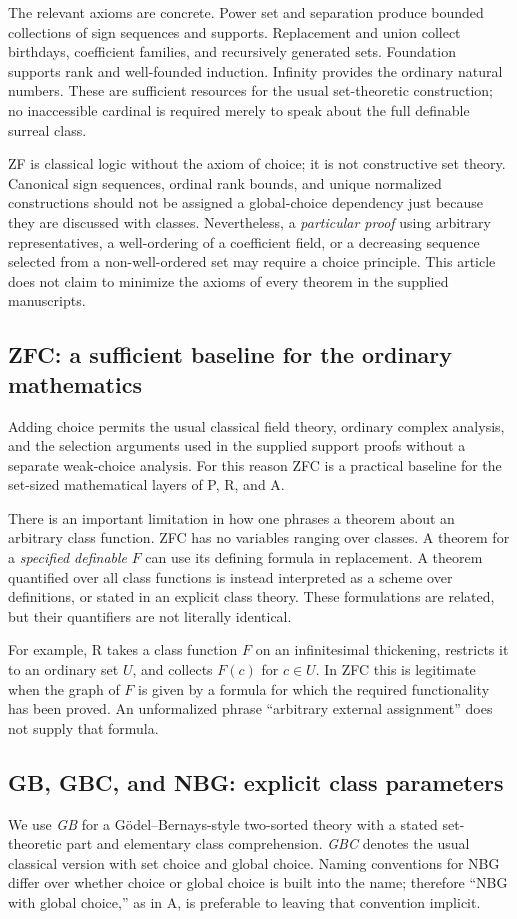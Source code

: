 \documentclass[11pt,letterpaper]{article}
\numberwithin{equation}{section}
\theoremstyle{definition}
\theoremstyle{remark}
\begin{document}
The relevant axioms are concrete. Power set and separation produce bounded collections of sign sequences and supports. Replacement and union collect birthdays, coefficient families, and recursively generated sets. Foundation supports rank and well-founded induction. Infinity provides the ordinary natural numbers. These are sufficient resources for the usual set-theoretic construction; no inaccessible cardinal is required merely to speak about the full definable surreal class.

ZF is classical logic without the axiom of choice; it is not constructive set theory. Canonical sign sequences, ordinal rank bounds, and unique normalized constructions should not be assigned a global-choice dependency just because they are discussed with classes. Nevertheless, a \emph{particular proof} using arbitrary representatives, a well-ordering of a coefficient field, or a decreasing sequence selected from a non-well-ordered set may require a choice principle. This article does not claim to minimize the axioms of every theorem in the supplied manuscripts.

\subsection{ZFC: a sufficient baseline for the ordinary mathematics}
Adding choice permits the usual classical field theory, ordinary complex analysis, and the selection arguments used in the supplied support proofs without a separate weak-choice analysis. For this reason ZFC is a practical baseline for the set-sized mathematical layers of P, R, and A.

There is an important limitation in how one phrases a theorem about an arbitrary class function. ZFC has no variables ranging over classes. A theorem for a \emph{specified definable} $F$ can use its defining formula in replacement. A theorem quantified over all class functions is instead interpreted as a scheme over definitions, or stated in an explicit class theory. These formulations are related, but their quantifiers are not literally identical.

For example, R takes a class function $F$ on an infinitesimal thickening, restricts it to an ordinary set $U$, and collects $F(c)$ for $c\in U$. In ZFC this is legitimate when the graph of $F$ is given by a formula for which the required functionality has been proved. An unformalized phrase ``arbitrary external assignment'' does not supply that formula.

\subsection{GB, GBC, and NBG: explicit class parameters}
We use \emph{GB} for a G\"odel--Bernays-style two-sorted theory with a stated set-theoretic part and elementary class comprehension. \emph{GBC} denotes the usual classical version with set choice and global choice. Naming conventions for NBG differ over whether choice or global choice is built into the name; therefore ``NBG with global choice,'' as in A, is preferable to leaving that convention implicit.
\end{document}
